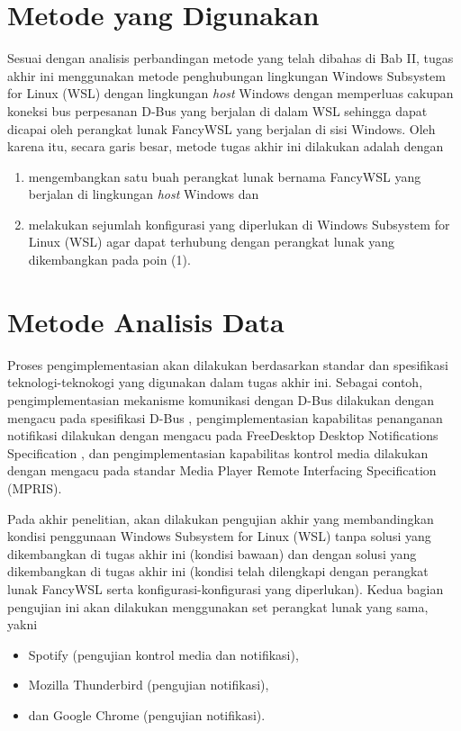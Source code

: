 \section{Metode yang Digunakan}

Sesuai dengan analisis perbandingan metode yang telah dibahas di Bab II, tugas akhir ini menggunakan metode penghubungan lingkungan Windows Subsystem for Linux (WSL) dengan lingkungan \textit{host} Windows dengan memperluas cakupan koneksi bus perpesanan D-Bus yang berjalan di dalam WSL sehingga dapat dicapai oleh perangkat lunak FancyWSL yang berjalan di sisi Windows. Oleh karena itu, secara garis besar, metode tugas akhir ini dilakukan adalah dengan
\begin{enumerate}
    \item mengembangkan satu buah perangkat lunak bernama FancyWSL yang berjalan di lingkungan \textit{host} Windows dan
    \item melakukan sejumlah konfigurasi yang diperlukan di Windows Subsystem for Linux (WSL) agar dapat terhubung dengan perangkat lunak yang dikembangkan pada poin (1).
\end{enumerate}

\section{Metode Analisis Data}

Proses pengimplementasian akan dilakukan berdasarkan standar dan spesifikasi teknologi-teknokogi yang digunakan dalam tugas akhir ini. Sebagai contoh, pengimplementasian mekanisme komunikasi dengan D-Bus dilakukan dengan mengacu pada spesifikasi D-Bus \cite{dbus-specification}, pengimplementasian kapabilitas penanganan notifikasi dilakukan dengan mengacu pada FreeDesktop Desktop Notifications Specification \cite{}, dan pengimplementasian kapabilitas kontrol media dilakukan dengan mengacu pada standar Media Player Remote Interfacing Specification (MPRIS). \cite{}

Pada akhir penelitian, akan dilakukan pengujian akhir yang membandingkan kondisi penggunaan Windows Subsystem for Linux (WSL) tanpa solusi yang dikembangkan di tugas akhir ini (kondisi bawaan) dan dengan solusi yang dikembangkan di tugas akhir ini (kondisi telah dilengkapi dengan perangkat lunak FancyWSL serta konfigurasi-konfigurasi yang diperlukan). Kedua bagian pengujian ini akan dilakukan menggunakan set perangkat lunak yang sama, yakni
\begin{itemize}
    \item Spotify (pengujian kontrol media dan notifikasi),
    \item Mozilla Thunderbird (pengujian notifikasi),
    \item dan Google Chrome (pengujian notifikasi).
\end{itemize}
